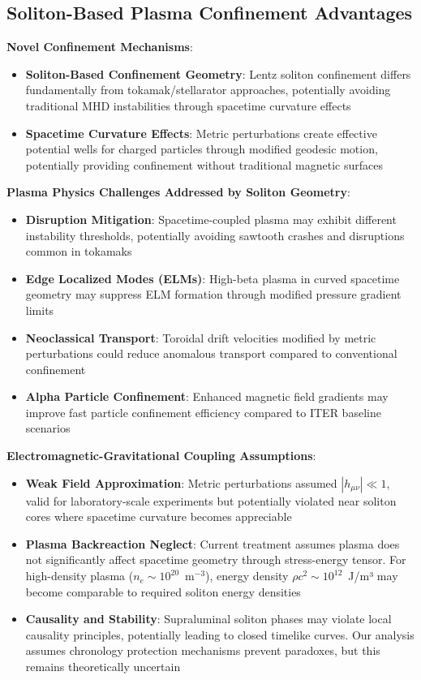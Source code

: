 \documentclass[12pt,a4paper]{article}
\begin{document}
\subsection{Soliton-Based Plasma Confinement Advantages}

\textbf{Novel Confinement Mechanisms}:
\begin{itemize}
\item \textbf{Soliton-Based Confinement Geometry}: Lentz soliton confinement differs fundamentally from tokamak/stellarator approaches, potentially avoiding traditional MHD instabilities through spacetime curvature effects
\item \textbf{Spacetime Curvature Effects}: Metric perturbations create effective potential wells for charged particles through modified geodesic motion, potentially providing confinement without traditional magnetic surfaces
\end{itemize}

\textbf{Plasma Physics Challenges Addressed by Soliton Geometry}:
\begin{itemize}
\item \textbf{Disruption Mitigation}: Spacetime-coupled plasma may exhibit different instability thresholds, potentially avoiding sawtooth crashes and disruptions common in tokamaks
\item \textbf{Edge Localized Modes (ELMs)}: High-beta plasma in curved spacetime geometry may suppress ELM formation through modified pressure gradient limits
\item \textbf{Neoclassical Transport}: Toroidal drift velocities modified by metric perturbations could reduce anomalous transport compared to conventional confinement
\item \textbf{Alpha Particle Confinement}: Enhanced magnetic field gradients may improve fast particle confinement efficiency compared to ITER baseline scenarios
\end{itemize}

\textbf{Electromagnetic-Gravitational Coupling Assumptions}:
\begin{itemize}
\item \textbf{Weak Field Approximation}: Metric perturbations assumed $|h_{\mu\nu}| \ll 1$, valid for laboratory-scale experiments but potentially violated near soliton cores where spacetime curvature becomes appreciable
\item \textbf{Plasma Backreaction Neglect}: Current treatment assumes plasma does not significantly affect spacetime geometry through stress-energy tensor. For high-density plasma ($n_e \sim 10^{20}$~m$^{-3}$), energy density $\rho c^2 \sim 10^{12}$~J/m³ may become comparable to required soliton energy densities
\item \textbf{Causality and Stability}: Supraluminal soliton phases may violate local causality principles, potentially leading to closed timelike curves. Our analysis assumes chronology protection mechanisms prevent paradoxes, but this remains theoretically uncertain
\end{itemize}
\end{document}
